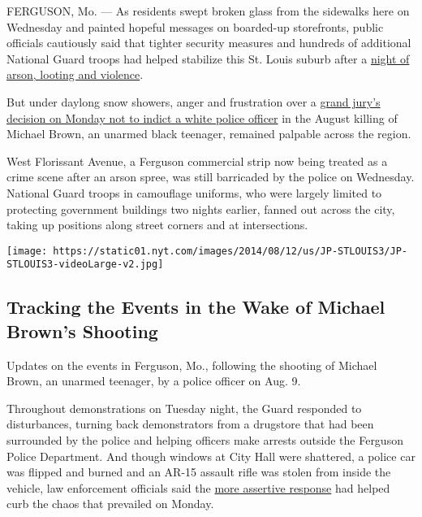 FERGUSON, Mo. --- As residents swept broken glass from the sidewalks
here on Wednesday and painted hopeful messages on boarded-up
storefronts, public officials cautiously said that tighter security
measures and hundreds of additional National Guard troops had helped
stabilize this St. Louis suburb after a
\href{http://www.nytimes.com/interactive/2014/11/25/us/ferguson-photos.html}{night
of arson, looting and violence}.

But under daylong snow showers, anger and frustration over a
\href{http://www.nytimes.com/2014/11/25/us/ferguson-darren-wilson-shooting-michael-brown-grand-jury.html}{grand
jury's decision on Monday not to indict a white police officer} in the
August killing of Michael Brown, an unarmed black teenager, remained
palpable across the region.

West Florissant Avenue, a Ferguson commercial strip now being treated as
a crime scene after an arson spree, was still barricaded by the police
on Wednesday. National Guard troops in camouflage uniforms, who were
largely limited to protecting government buildings two nights earlier,
fanned out across the city, taking up positions along street corners and
at intersections.

\href{https://www.nytimes.com/interactive/2014/11/09/us/10ferguson-michael-brown-shooting-grand-jury-darren-wilson.html}{}

\texttt{[image: https://static01.nyt.com/images/2014/08/12/us/JP-STLOUIS3/JP-STLOUIS3-videoLarge-v2.jpg]}

\hypertarget{tracking-the-events-in-the-wake-of-michael-browns-shooting}{%
\subsection{Tracking the Events in the Wake of Michael Brown's
Shooting}\label{tracking-the-events-in-the-wake-of-michael-browns-shooting}}

Updates on the events in Ferguson, Mo., following the shooting of
Michael Brown, an unarmed teenager, by a police officer on Aug. 9.

Throughout demonstrations on Tuesday night, the Guard responded to
disturbances, turning back demonstrators from a drugstore that had been
surrounded by the police and helping officers make arrests outside the
Ferguson Police Department. And though windows at City Hall were
shattered, a police car was flipped and burned and an AR-15 assault
rifle was stolen from inside the vehicle, law enforcement officials said
the
\href{http://www.nytimes.com/2014/11/26/us/ferguson-missouri-violence.html?ref=us}{more
assertive response} had helped curb the chaos that prevailed on Monday.


